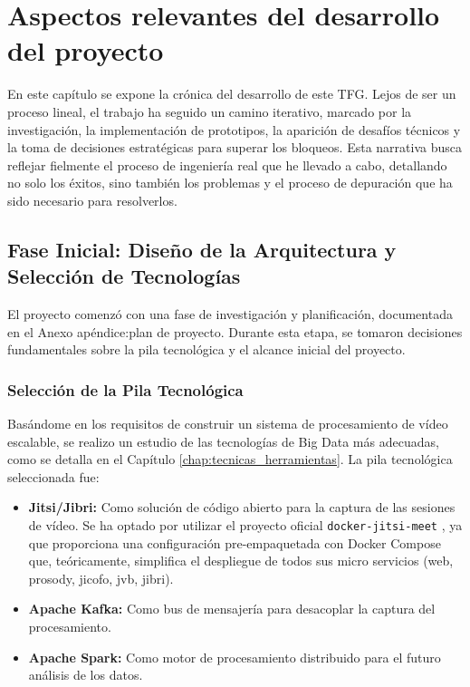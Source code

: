 \chapter{Aspectos relevantes del desarrollo del proyecto}
\label{chap:desarrollo}

En este capítulo se expone la crónica del desarrollo de este TFG. Lejos de ser un proceso lineal, el trabajo ha seguido un camino iterativo, marcado por la investigación, la implementación de prototipos, la aparición de desafíos técnicos y la toma de decisiones estratégicas para superar los bloqueos. Esta narrativa busca reflejar fielmente el proceso de ingeniería real que he llevado a cabo, detallando no solo los éxitos, sino también los problemas y el proceso de depuración que ha sido necesario para resolverlos.

\section{Fase Inicial: Diseño de la Arquitectura y Selección de Tecnologías}
El proyecto comenzó con una fase de investigación y planificación, documentada en el Anexo apéndice:plan de proyecto. Durante esta etapa, se tomaron decisiones fundamentales sobre la pila tecnológica y el alcance inicial del proyecto.

\subsection{Selección de la Pila Tecnológica}
Basándome en los requisitos de construir un sistema de procesamiento de vídeo escalable, se realizo un estudio de las tecnologías de Big Data más adecuadas, como se detalla en el Capítulo \ref{chap:tecnicas_herramientas}. La pila tecnológica seleccionada fue:
\begin{itemize}
    \item \textbf{Jitsi/Jibri:} Como solución de código abierto para la captura de las sesiones de vídeo. Se ha optado por utilizar el proyecto oficial \texttt{docker-jitsi-meet} \cite{jitsi_docker_repo}, ya que proporciona una configuración pre-empaquetada con Docker Compose que, teóricamente, simplifica el despliegue de todos sus micro servicios (web, prosody, jicofo, jvb, jibri).
    \item \textbf{Apache Kafka:} Como bus de mensajería para desacoplar la captura del procesamiento.
    \item \textbf{Apache Spark:} Como motor de procesamiento distribuido para el futuro análisis de los datos.
\end{itemize}

